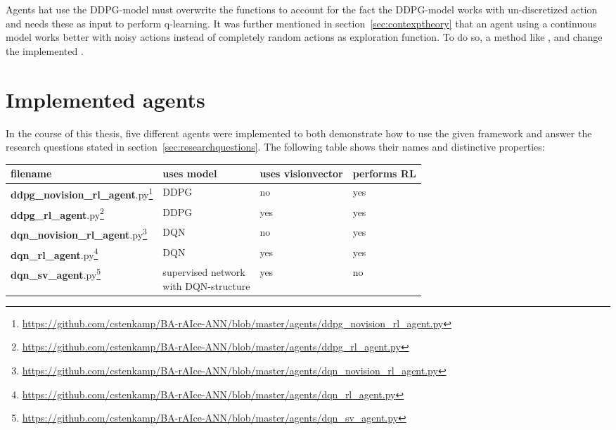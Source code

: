 Agents hat use the DDPG-model must overwrite the functions  to account for the fact the DDPG-model works with un-discretized action and needs these as input to perform q-learning. 
It was further mentioned in section~\ref{sec:contexptheory} that an agent using a continuous model works better with noisy actions instead of completely random actions as exploration function. To do so, a method like , and change the implemented .

\section{Implemented agents}

In the course of this thesis, five different agents were implemented to both demonstrate how to use the given framework and answer the research questions stated in section~\ref{sec:researchquestions}.  The following table shows their names and distinctive properties: 

\begin{flushleft}
\begin{tabular}{l l l l}
	filename & uses model & uses visionvector & performs RL\\
	\hline
	\textbf{ddpg\_novision\_rl\_agent}.py\footnote{\url{https://github.com/cstenkamp/BA-rAIce-ANN/blob/master/agents/ddpg_novision_rl_agent.py}} & DDPG & no & yes\\	
	\textbf{ddpg\_rl\_agent}.py\footnote{\url{https://github.com/cstenkamp/BA-rAIce-ANN/blob/master/agents/ddpg_rl_agent.py}} & DDPG & yes & yes\\
	\textbf{dqn\_novision\_rl\_agent}.py\footnote{\url{https://github.com/cstenkamp/BA-rAIce-ANN/blob/master/agents/dqn_novision_rl_agent.py}} & DQN & no & yes\\
	\textbf{dqn\_rl\_agent}.py\footnote{\url{https://github.com/cstenkamp/BA-rAIce-ANN/blob/master/agents/dqn_rl_agent.py}} & DQN & yes & yes\\
	\textbf{dqn\_sv\_agent}.py\footnote{\url{https://github.com/cstenkamp/BA-rAIce-ANN/blob/master/agents/dqn_sv_agent.py}} & \blap{supervised network\\ with DQN-structure} & yes & no\\[2em]
\end{tabular}
\end{flushleft}

